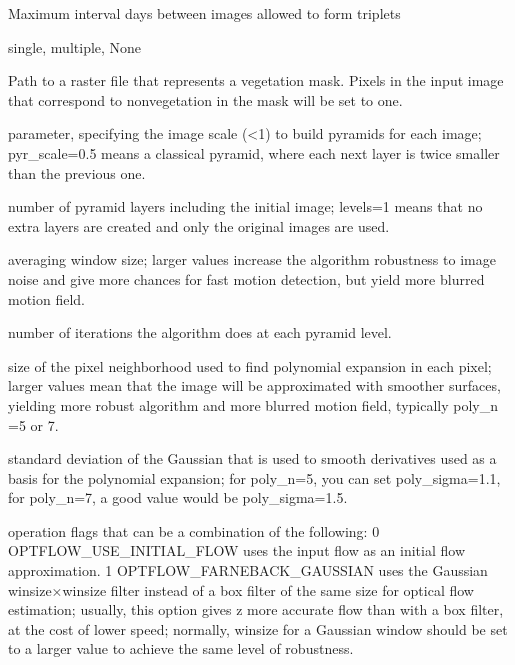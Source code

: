 \documentclass[letterpaper,10pt,english]{sphinxmanual}
\begin{document}
\begin{fulllineitems}
\begin{description}
\sphinxAtStartPar
Maximum interval days between images allowed to form triplets

\sphinxAtStartPar
single, multiple, None

\sphinxAtStartPar
Path to a raster file that represents a vegetation mask. Pixels in the input image
that correspond to non\sphinxhyphen{}vegetation in the mask will be set to one.

\sphinxAtStartPar
parameter, specifying the image scale (\textless{}1) to build pyramids for each image; pyr\_scale=0.5 means a classical pyramid, where each next layer is twice smaller than the previous one.

\sphinxAtStartPar
number of pyramid layers including the initial image; levels=1 means that no extra layers are created and only the original images are used.

\sphinxAtStartPar
averaging window size; larger values increase the algorithm robustness to image noise and give more chances for fast motion detection, but yield more blurred motion field.

\sphinxAtStartPar
number of iterations the algorithm does at each pyramid level.

\sphinxAtStartPar
size of the pixel neighborhood used to find polynomial expansion in each pixel; 
larger values mean that the image will be approximated with smoother surfaces, 
yielding more robust algorithm and more blurred motion field, typically poly\_n =5 or 7.

\sphinxAtStartPar
standard deviation of the Gaussian that is used to smooth derivatives used as a basis for the polynomial expansion; 
for poly\_n=5, you can set poly\_sigma=1.1, for poly\_n=7, a good value would be poly\_sigma=1.5.

\sphinxAtStartPar
operation flags that can be a combination of the following:
0 OPTFLOW\_USE\_INITIAL\_FLOW uses the input flow as an initial flow approximation.
1 OPTFLOW\_FARNEBACK\_GAUSSIAN uses the Gaussian winsize×winsize filter instead of a box filter of the same size for optical flow estimation; 
usually, this option gives z more accurate flow than with a box filter, at the cost of lower speed; 
normally, winsize for a Gaussian window should be set to a larger value to achieve the same level of robustness.


\end{description}
\end{fulllineitems}
\end{document}
